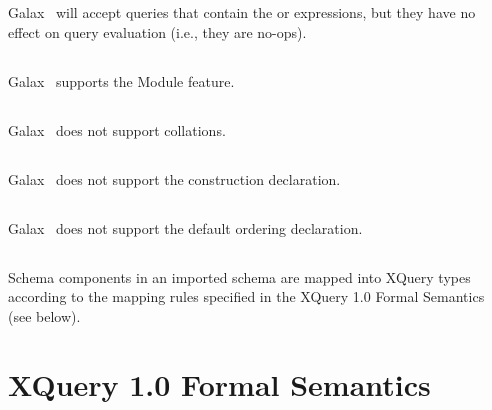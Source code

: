 Galax \version\ will accept queries that contain the  or
    expressions, but they have no effect on query
  evaluation (i.e., they are no-ops). 

\subsection*{}
\subsection*{}

Galax \version\ supports the Module feature.

\subsection*{}

    Galax \version\ does not support collations.

\subsection*{}

Galax \version\ does not support the construction declaration. 

\subsection*{}

Galax \version\ does not support the default ordering declaration. 

\subsection*{}

      Schema components in an imported schema are mapped into XQuery 
      types according to the mapping rules specified in the XQuery 1.0
      Formal Semantics (see below).

\section{XQuery 1.0 Formal Semantics}

